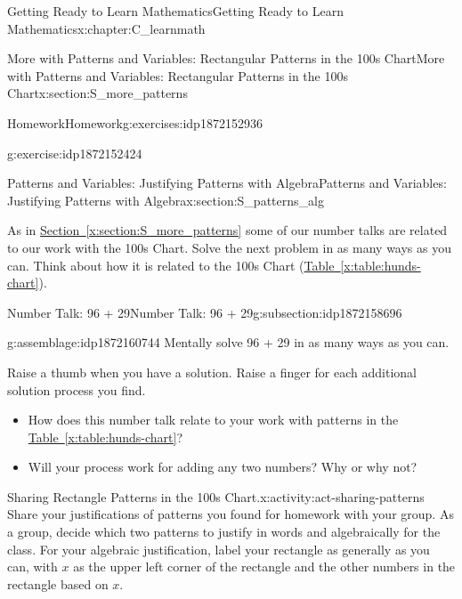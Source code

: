 \documentclass[oneside,10pt,]{book}
\newcommand{\xreffont}{\relax}
\numberwithin{equation}{chapter}
\begin{document}
\begin{chapterptx}{Getting Ready to Learn Mathematics}{}{Getting Ready to Learn Mathematics}{}{}{x:chapter:C_learnmath}
\begin{sectionptx}{More with Patterns and Variables: Rectangular Patterns in the 100s Chart}{}{More with Patterns and Variables: Rectangular Patterns in the 100s Chart}{}{}{x:section:S_more_patterns}
\begin{exercises-subsection}{Homework}{}{Homework}{}{}{g:exercises:idp1872152936}
\begin{divisionexercise}{3}{}{}{g:exercise:idp1872152424}
\end{divisionexercise}%
\end{exercises-subsection}
\end{sectionptx}
%
%
\typeout{************************************************}
\typeout{************************************************}
%
\begin{sectionptx}{Patterns and Variables: Justifying Patterns with Algebra}{}{Patterns and Variables: Justifying Patterns with Algebra}{}{}{x:section:S_patterns_alg}
\begin{introduction}{}%
As in \hyperref[x:section:S_more_patterns]{Section~{\xreffont\ref{x:section:S_more_patterns}}} some of our number talks are related to our work with the 100s Chart. Solve the next problem in as many ways as you can. Think about how it is related to the 100s Chart (\hyperref[x:table:hunds-chart]{Table~{\xreffont\ref{x:table:hunds-chart}}}).%
\end{introduction}%
%
%
\typeout{************************************************}
\typeout{************************************************}
%
\begin{subsectionptx}{Number Talk: 96 + 29}{}{Number Talk: 96 + 29}{}{}{g:subsection:idp1872158696}
\begin{assemblage}{}{g:assemblage:idp1872160744}%
Mentally solve 96 + 29 in as many ways as you can.%
\par
Raise a thumb when you have a solution. Raise a finger for each additional solution process you find.%
\end{assemblage}
%
\begin{itemize}[label=\textbullet]
\item{}How does this number talk relate to your work with patterns in the \hyperref[x:table:hunds-chart]{Table~{\xreffont\ref{x:table:hunds-chart}}}?%
\item{}Will your process work for adding any two numbers? Why or why not?%
\end{itemize}
\end{subsectionptx}
\begin{activity}{Sharing Rectangle Patterns in the 100s Chart.}{x:activity:act-sharing-patterns}%
Share your justifications of patterns you found for homework with your group. As a group, decide which two patterns to justify in words and algebraically for the class. For your algebraic justification, label your rectangle as generally as you can, with \(x\) as the upper left corner of the rectangle and the other numbers in the rectangle based on \(x\).%

\end{activity}
\end{sectionptx}
\end{chapterptx}
\end{document}
